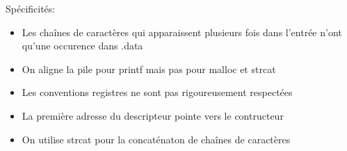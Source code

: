\documentclass[12pt,a4paper]{report}
\begin{document}
Spécificités:
\begin{itemize}
	\item Les chaînes de caractères qui apparaissent plusieurs fois dans l'entrée n'ont qu'une occurence dans .data
	\item On aligne la pile pour printf mais pas pour malloc et strcat
	\item Les conventions registres ne sont pas rigoureusement respectées
	\item La première adresse du descripteur pointe vers le contructeur
	\item On utilise strcat pour la concaténaton de chaînes de caractères
\end{itemize}
\end{document}
